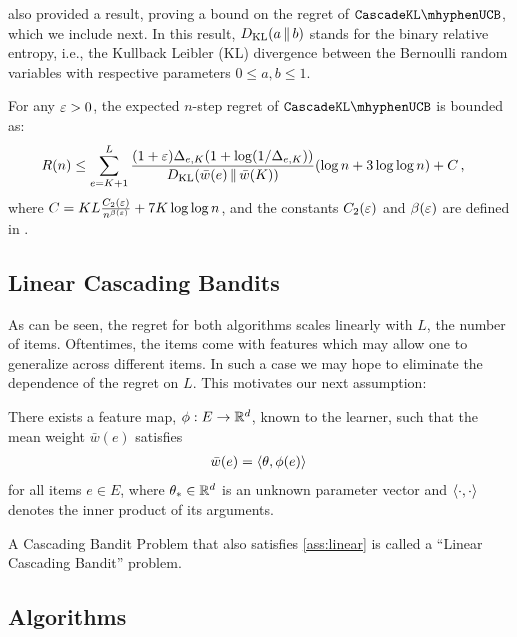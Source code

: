 \citet{kveton15cascade}  also provided a result, proving a bound on the regret of $\cascadeklucb$, which we include next.
In this result, $D_\mathrm{KL}(a \,\|\, b)$ stands for the binary relative entropy, i.e., the Kullback Leibler (KL) divergence between the Bernoulli random variables with respective parameters $0\le a,b\le 1$.
\begin{theorem}
\label{thm:klucb} For any $\varepsilon > 0$, the expected $n$-step regret of $\cascadeklucb$ is bounded as:
\begin{align*}
  R(n)
  & \leq \sum_{e = K + 1}^L
  \frac{(1 + \varepsilon) \Delta_{e, K} (1 + \log(1 / \Delta_{e, K}))}{D_\mathrm{KL}(\bar{w}(e) \,\|\, \bar{w}(K))} (\log n + 3 \log \log n) + C\,,
\end{align*}
where $C = K L \frac{C_2(\varepsilon)}{n^{\beta(\varepsilon)}} + 7 K \log \log n$, and the constants $C_2(\varepsilon)$ and $\beta(\varepsilon)$ are defined in \citet{garivier11klucb}. 
\end{theorem}

\subsection{Linear Cascading Bandits}
As can be seen, the regret for both algorithms scales linearly with $L$, the number of items.
Oftentimes, the items come with features which may allow one to generalize across different items.
In such a case we may hope to eliminate the dependence of the regret on $L$.
This motivates our next assumption:
\begin{assumption}
\label{ass:linear} 
There exists a feature map, $\phi:E \to \mathbb{R}^d$, known to the learner, such that 
the mean weight $\bar{w}(e)$ satisfies
\begin{align*}
  \bar{w}(e) = \langle \theta, \phi(e) \rangle\,
\end{align*}
for all items $e\in E$, where $\theta_*\in \mathbb{R}^d$ is an unknown parameter vector
and $\langle \cdot,\cdot \rangle$ denotes the inner product of its arguments. 
\end{assumption}
A Cascading Bandit Problem that also satisfies \cref{ass:linear} is called a ``Linear Cascading Bandit'' problem.

\subsection{Algorithms}
\label{sec:algorithms}

